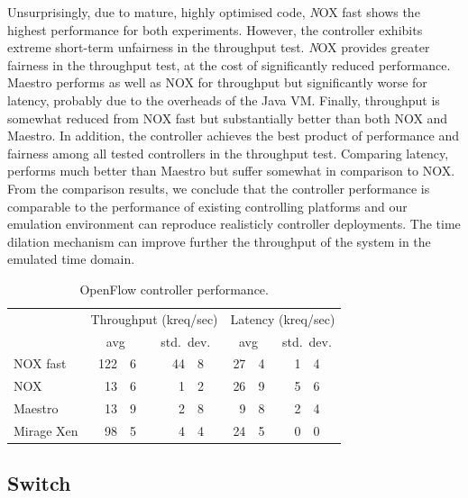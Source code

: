 Unsurprisingly, due to mature, highly optimised code, {\emph NOX fast} shows the
highest performance for both experiments. However, the controller exhibits
extreme short-term unfairness in the throughput test.  {\emph NOX} provides
greater fairness in the throughput test, at the cost of significantly reduced
performance. Maestro performs as well as NOX for throughput but significantly
worse for latency, probably due to the overheads of the Java VM\@.  Finally,
\mirage throughput is somewhat reduced from NOX fast but substantially better
than both NOX and Maestro. In addition, the \mirage controller achieves the best
product of performance and fairness among all tested controllers in the
throughput test.  Comparing latency, \mirage performs much better than Maestro
but suffer somewhat in comparison to NOX\@. From the comparison results, we
conclude that the \mirage controller performance is comparable to the
performance of existing controlling platforms and our emulation environment can
reproduce realisticly controller deployments. The \sdnsim time dilation
mechanism can improve further the throughput of the system in the emulated time
domain.

\begin{table}
\newcommand\T{\rule{0pt}{2.6ex}}
\newcommand\B{\rule[-1.2ex]{0pt}{0pt}}
\centering
\begin{tabular} {l |r@{.}l r@{.}l|r@{.}l r@{.}l}
\hline
\T \multirow{2}{*}{Controller} 
   & \multicolumn{4}{c|}{Throughput (kreq/sec)}  
   & \multicolumn{4}{c}{Latency (kreq/sec)} \\
\B & \multicolumn{2}{c}{avg} & \multicolumn{2}{c|}{std.\ dev.} 
   & \multicolumn{2}{c}{avg} & \multicolumn{2}{c}{std.\ dev.} \\
\hline
\T NOX fast   & 122&6 & \quad{} 44&8 & 27&4 & \quad{} 1&4 \\
NOX           &  13&6 &  1&2 & 26&9 & 5&6 \\
Maestro       &  13&9 &  2&8 &  9&8 & 2&4 \\
\B Mirage Xen &  98&5 &  4&4 & 24&5 & 0&0 \\
\hline
\end{tabular}
\caption{\label{tbl:controller}OpenFlow controller performance.}
\end{table}

\subsection{\mirage Switch} \label{sec:of-switch-perf}

